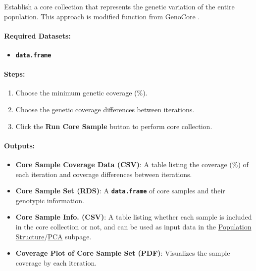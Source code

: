 \documentclass[
]{book}
\providecommand{\tightlist}{%
  \setlength{\itemsep}{0pt}\setlength{\parskip}{0pt}}
\begin{document}
Establish a core collection that represents the genetic variation of the entire population. This approach is modified function from GenoCore \citep{Jeong2017}.

\paragraph*{Required Datasets:}\label{required-datasets-4}

\begin{itemize}
\tightlist
\item
  {\textbf{\texttt{data.frame}}}
\end{itemize}

\paragraph*{\texorpdfstring{\textbf{Steps:}}{Steps:}}\label{steps-11}

\begin{enumerate}
\def\labelenumi{\arabic{enumi}.}
\item
  Choose the minimum genetic coverage (\%).
\item
  Choose the genetic coverage differences between iterations.
\item
  Click the {\textbf{Run Core Sample}} button to perform core collection.
\end{enumerate}

\paragraph*{Outputs:}\label{outputs-20}

\begin{itemize}
\item
  \textbf{Core Sample Coverage Data (CSV)}: A table listing the coverage (\%) of each iteration and coverage differences between iterations.
\item
  \textbf{Core Sample Set (RDS)}: A {\textbf{\texttt{data.frame}}} of core samples and their genotypic information.
\item
  \textbf{Core Sample Info. (CSV)}: A table listing whether each sample is included in the core collection or not, and can be used as input data in the \ul{Population Structure}/\ul{PCA} subpage.
\item
  \textbf{Coverage Plot of Core Sample Set (PDF)}: Visualizes the sample coverage by each iteration.
\end{itemize}
\end{document}
